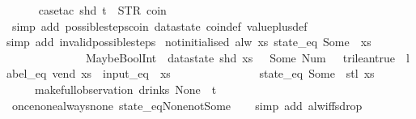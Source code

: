 \begin{isabellebody}
\ \ \ \ \isamarkupfalse%
\ {\isacharparenleft}case{\isacharunderscore}tac\ {\isachardoublequoteopen}shd\ t\ {\isacharequal}\ {\isacharparenleft}STR\ {\isacharprime}{\isacharprime}coin{\isacharprime}{\isacharprime}{\isacharcomma}\ {\isacharbrackleft}{\isacharbrackright}{\isacharparenright}{\isachardoublequoteclose}{\isacharparenright}\isanewline
\ \ \ \isamarkupfalse%
\ {\isacharparenleft}simp\ add{\isacharcolon}\ possible{\isacharunderscore}steps{\isacharunderscore}coin\ datastate\ coin{\isacharunderscore}def\ value{\isacharunderscore}plus{\isacharunderscore}def{\isacharparenright}\isanewline
\ \ \isamarkupfalse%
{\isacharparenleft}simp\ add{\isacharcolon}\ invalid{\isacharunderscore}possible{\isacharunderscore}steps{\isacharunderscore}{}{\isacharparenright}%
\endisatagproof
{\isafoldproof}%
%
\isadelimproof
\isanewline
%
\endisadelimproof
\isanewline
{}\isamarkupfalse%
\ not{\isacharunderscore}initialised{\isacharcolon}\ {\isachardoublequoteopen}alw\ {\isacharparenleft}{\isasymlambda}xs{\isachardot}\ state_eq\ {\isacharparenleft}Some\ {}{\isacharparenright}\ xs\ {\isasymand}\isanewline
\ \ \ \ \ \ \ \ \ \ \ \ \ \ MaybeBoolInt\ {\isacharparenleft}{\isacharless}{\isacharparenright}\ {\isacharparenleft}datastate\ {\isacharparenleft}shd\ xs{\isacharparenright}\ {\isachardollar}\ {\isacharparenleft}{}{\isacharparenright}{\isacharparenright}\ {\isacharparenleft}Some\ {\isacharparenleft}Num\ {}{\isacharparenright}{\isacharparenright}\ {\isacharequal}\ trilean{\isachardot}true\ {\isasymand}\ label_eq\ {\isacharprime}{\isacharprime}vend{\isacharprime}{\isacharprime}\ xs\ {\isasymand}\ input_eq\ {\isacharbrackleft}{\isacharbrackright}\ xs\ {\isasymlongrightarrow}\isanewline
\ \ \ \ \ \ \ \ \ \ \ \ \ \ state_eq\ {\isacharparenleft}Some\ {}{\isacharparenright}\ {\isacharparenleft}stl\ xs{\isacharparenright}{\isacharparenright}\isanewline
\ \ \ \ \ {\isacharparenleft}make{\isacharunderscore}full{\isacharunderscore}observation\ drinks\ None\ {\isacharless}{\isachargreater}\ t{\isacharparenright}{\isachardoublequoteclose}\isanewline
%
\isadelimproof
\ \ %
\endisadelimproof
%
\isatagproof
{}\isamarkupfalse%
\ once{\isacharunderscore}none{\isacharunderscore}always{\isacharunderscore}none\ state_eq{\isacharunderscore}None{\isacharunderscore}not{\isacharunderscore}Some\isanewline
\ \ \isamarkupfalse%
\ {\isacharparenleft}simp\ add{\isacharcolon}\ alw{\isacharunderscore}iff{\isacharunderscore}sdrop{\isacharparenright}%

\end{isabellebody}
